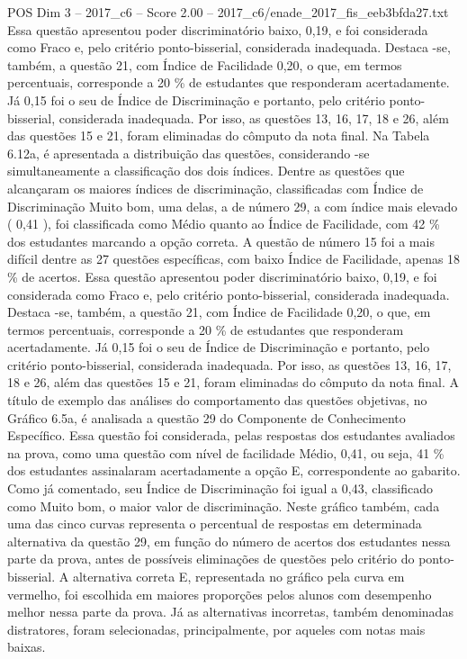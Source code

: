 \begin{textsample}{POS Dim 3 – 2017\_c6 – Score 2.00 – 2017\_c6/enade\_2017\_fis\_eeb3bfda27.txt}
Essa questão apresentou poder discriminatório baixo, 0,19, e foi considerada como Fraco e, pelo critério ponto-bisserial, considerada inadequada.
Destaca -se, também, a questão 21, com Índice de Facilidade 0,20, o que, em termos percentuais, corresponde a 20 \% de estudantes que responderam acertadamente.
Já 0,15 foi o seu de Índice de Discriminação e portanto, pelo critério ponto-bisserial, considerada inadequada.
Por isso, as questões 13, 16, 17, 18 e 26, além das questões 15 e 21, foram eliminadas do cômputo da nota final.
Na Tabela 6.12a, é apresentada a distribuição das questões, considerando -se simultaneamente a classificação dos dois índices.
Dentre as questões que alcançaram os maiores índices de discriminação, classificadas com Índice de Discriminação Muito bom, uma delas, a de número 29, a com índice mais elevado ( 0,41 ), foi classificada como Médio quanto ao Índice de Facilidade, com 42 \% dos estudantes marcando a opção correta.
A questão de número 15 foi a mais difícil dentre as 27 questões específicas, com baixo Índice de Facilidade, apenas 18 \% de acertos.
Essa questão apresentou poder discriminatório baixo, 0,19, e foi considerada como Fraco e, pelo critério ponto-bisserial, considerada inadequada.
Destaca -se, também, a questão 21, com Índice de Facilidade 0,20, o que, em termos percentuais, corresponde a 20 \% de estudantes que responderam acertadamente.
Já 0,15 foi o seu de Índice de Discriminação e portanto, pelo critério ponto-bisserial, considerada inadequada.
Por isso, as questões 13, 16, 17, 18 e 26, além das questões 15 e 21, foram eliminadas do cômputo da nota final.
A título de exemplo das análises do comportamento das questões objetivas, no Gráfico 6.5a, é analisada a questão 29 do Componente de Conhecimento Específico.
Essa questão foi considerada, pelas respostas dos estudantes avaliados na prova, como uma questão com nível de facilidade Médio, 0,41, ou seja, 41 \% dos estudantes assinalaram acertadamente a opção E, correspondente ao gabarito.
Como já comentado, seu Índice de Discriminação foi igual a 0,43, classificado como Muito bom, o maior valor de discriminação.
Neste gráfico também, cada uma das cinco curvas representa o percentual de respostas em determinada alternativa da questão 29, em função do número de acertos dos estudantes nessa parte da prova, antes de possíveis eliminações de questões pelo critério do ponto-bisserial.
A alternativa correta E, representada no gráfico pela curva em vermelho, foi escolhida em maiores proporções pelos alunos com desempenho melhor nessa parte da prova.
Já as alternativas incorretas, também denominadas distratores, foram selecionadas, principalmente, por aqueles com notas mais baixas.

\end{textsample}
